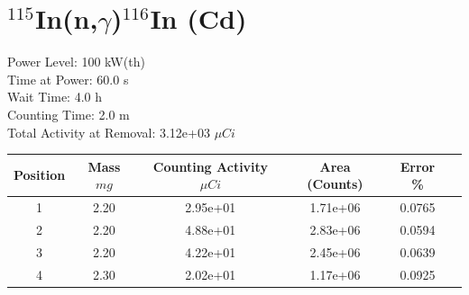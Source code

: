\newpage

\section*{ $^{115}$In(n,$\gamma$)$^{116}$In (Cd) }

Power Level: 100 kW(th) \\
Time at Power: 60.0 s \\
Wait Time:  4.0 h \\
Counting Time:  2.0 m \\
Total Activity at Removal: 3.12e+03 $\mu Ci$

\begin{table}[h]
\centering
\begin{tabular}{ |c|c|c|c|c|c| }
 \hline
 Position & Mass $mg$ & Counting Activity $\mu Ci$ & Area (Counts) & Error \% \\
 \hline 
 1 & 2.20 & 2.95e+01 & 1.71e+06 & 0.0765 \\ 
\hline
 2 & 2.20 & 4.88e+01 & 2.83e+06 & 0.0594 \\ 
\hline
 3 & 2.20 & 4.22e+01 & 2.45e+06 & 0.0639 \\ 
\hline
 4 & 2.30 & 2.02e+01 & 1.17e+06 & 0.0925 \\ 
\hline
\end{tabular}
\end{table}

